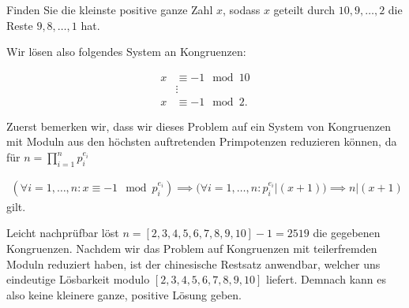 
\begin{exercise}

Finden Sie die kleinste positive ganze Zahl $x$, sodass $x$ geteilt durch
$10,9,\dots,2$ die Reste $9,8,\dots,1$ hat.

\end{exercise}


\begin{solution}

Wir lösen also folgendes System an Kongruenzen:
        
\begin{align*}
    x &\equiv -1 \mod{10} \\
    &\vdots \\
    x &\equiv -1 \mod{2}.
\end{align*}

Zuerst bemerken wir, dass wir dieses Problem auf ein System von
Kongruenzen mit Moduln aus den höchsten auftretenden Primpotenzen 
reduzieren können, da für $n = \prod_{i=1}^n p_i^{e_i}$

\begin{align*}
    (\forall i = 1,\dots,n: x \equiv -1 \mod{p_i^{e_i}}) 
    \implies (\forall i = 1,\dots,n: p_i^{e_i} | (x + 1))
    \implies n | (x+1)
\end{align*}
gilt.

Leicht nachprüfbar löst $n = [2,3,4,5,6,7,8,9,10] - 1 = 2519$ die gegebenen Kongruenzen.
Nachdem wir das Problem auf Kongruenzen mit teilerfremden Moduln reduziert haben,
ist der chinesische Restsatz anwendbar, welcher uns eindeutige Lösbarkeit modulo $[2,3,4,5,6,7,8,9,10]$
liefert. Demnach kann es also keine kleinere ganze, positive Lösung geben.



\end{solution}

